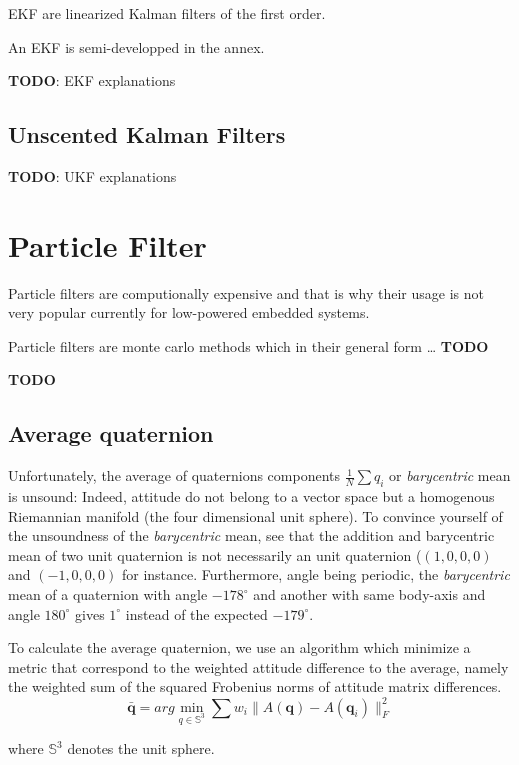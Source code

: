 \documentclass[]{article}
\begin{document}
EKF are linearized Kalman filters of the first order.

An EKF is semi-developped in the annex.

\textbf{TODO}: EKF explanations

\subsection{Unscented Kalman Filters}\label{unscented-kalman-filters}

\textbf{TODO}: UKF explanations

\section{Particle Filter}\label{particle-filter}

Particle filters are computionally expensive and that is why their usage
is not very popular currently for low-powered embedded systems.

Particle filters are monte carlo methods which in their general form
\ldots{} \textbf{TODO}

\textbf{TODO}

\subsection{Average quaternion}\label{average-quaternion}

Unfortunately, the average of quaternions components
\(\frac{1}{N} \sum q_i\) or \emph{barycentric} mean is unsound: Indeed,
attitude do not belong to a vector space but a homogenous Riemannian
manifold (the four dimensional unit sphere). To convince yourself of the
unsoundness of the \emph{barycentric} mean, see that the addition and
barycentric mean of two unit quaternion is not necessarily an unit
quaternion (\((1, 0, 0, 0)\) and \((-1, 0, 0, 0)\) for instance.
Furthermore, angle being periodic, the \emph{barycentric} mean of a
quaternion with angle \(-178^\circ\) and another with same body-axis and
angle \(180^\circ\) gives \(1^\circ\) instead of the expected
\(-179^\circ\).

To calculate the average quaternion, we use an algorithm which minimize
a metric that correspond to the weighted attitude difference to the
average, namely the weighted sum of the squared Frobenius norms of
attitude matrix differences.
\[\bar{\mathbf{q}} = arg \min_{q \in \mathbb{S}^3} \sum w_i \| A(\mathbf{q}) - A(\mathbf{q}_i) \|^2_F\]

where \(\mathbb{S}^3\) denotes the unit sphere.
\end{document}
